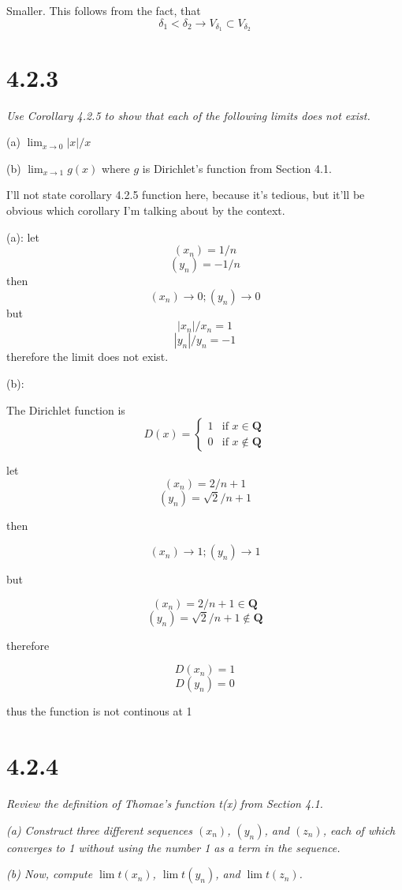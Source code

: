 \documentclass[11pt,oneside,titlepage]{book}
\begin{document}
Smaller. This follows from the fact, that
$$\delta_1 < \delta_2 \to V_{\delta_1} \subset V_{\delta_2}$$

\section*{4.2.3}
\textit{Use Corollary 4.2.5 to show that each of the following limits does not exist.}

(a) $\lim_{x\to0} |x|/x$

(b) $\lim_{x\to 1} g(x)$ where $g$ is Dirichlet’s function from Section 4.1.

I'll not state corollary 4.2.5  function here, because it's tedious, but it'll be obvious which corollary I'm talking about by the context.


(a): let
$$(x_n) = 1/n$$
$$(y_n) = -1/n$$
then
$$(x_n) \to 0;(y_n) \to 0$$
but
$$|x_n| / x_n = 1$$
$$|y_n| / y_n = -1$$
therefore the limit does not exist.

(b):

The Dirichlet function is
\begin{equation}
D(x)=
    \begin{cases}
        1 & \text{if } x \in \textbf{Q}\\
        0 & \text{if } x \notin \textbf{Q}
    \end{cases}
\end{equation}

let
$$(x_n) = 2/n + 1$$
$$(y_n) = \sqrt{2}/n + 1$$

then

$$(x_n) \to 1;(y_n) \to 1$$

but

$$(x_n) = 2/n + 1 \in \textbf{Q}$$
$$(y_n) = \sqrt{2}/n + 1 \notin \textbf{Q}$$

therefore

$$ D(x_n) = 1$$
$$ D(y_n) = 0$$

thus the function is not continous at 1

\section*{4.2.4}
\textit{Review the definition of Thomae’s function t(x) from Section 4.1.}

\textit{(a) Construct three different sequences $(x_n)$, $(y_n)$, and $(z_n)$,
  each of which converges to 1 without using the number 1 as a term in the sequence.}

\textit{(b) Now, compute $\lim t(x_n)$, $\lim t(y_n)$, and $\lim t(z_n)$.}
\end{document}
